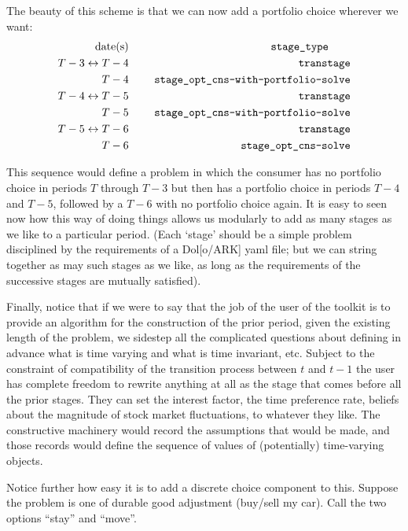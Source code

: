 \documentclass[\econtexRoot/BufferStockTheory]{subfiles}
\begin{document}
The beauty of this scheme is that we can now add a portfolio choice wherever we want:
\begin{alignat}{3}
\text{date(s)}            &      &   \notag      \qquad \texttt{stage\_type} \qquad
\\ T-3\leftrightarrow T-4 & ~~~~ & \text{\texttt{transtage}}
\\ T-4                    & ~~~~ & \text{\texttt{stage\_opt\_cns-with-portfolio-solve}}
\\ T-4\leftrightarrow T-5 & ~~~~ & \text{\texttt{transtage}}
\\ T-5                    & ~~~~ & \text{\texttt{stage\_opt\_cns-with-portfolio-solve}}
\\ T-5\leftrightarrow T-6 & ~~~~ & \text{\texttt{transtage}}
\\ T-6                    & ~~~~ & \text{\texttt{stage\_opt\_cns-solve}}
\end{alignat}

This sequence would define a problem in which the consumer has no portfolio choice in periods $T$ through $T-3$ but then has a portfolio choice in periods $T-4$ and $T-5$, followed by a $T-6$ with no portfolio choice again.  It is easy to seen now how this way of doing things allows us modularly to add as many stages as we like to a particular period.  (Each `stage' should be a simple problem disciplined by the requirements of a Dol[o/ARK] yaml file; but we can string together as may such stages as we like, as long as the requirements of the successive stages are mutually satisfied).

Finally, notice that if we were to say that the job of the user of the toolkit is to provide an algorithm for the construction of the prior period, given the existing length of the problem, we sidestep all the complicated questions about defining in advance what is time varying and what is time invariant, etc.  Subject to the constraint of compatibility of the transition process between $t$ and $t-1$ the user has complete freedom to rewrite anything at all as the stage that comes before all the prior stages.  They can set the interest factor, the time preference rate, beliefs about the magnitude of stock market fluctuations, to whatever they like.  The constructive machinery would record the assumptions that would be made, and those records would define the sequence of values of (potentially) time-varying objects.

Notice further how easy it is to add a discrete choice component to this.  Suppose the problem is one of durable good adjustment (buy/sell my car).  Call the two options ``stay'' and ``move''.  
\end{document}
